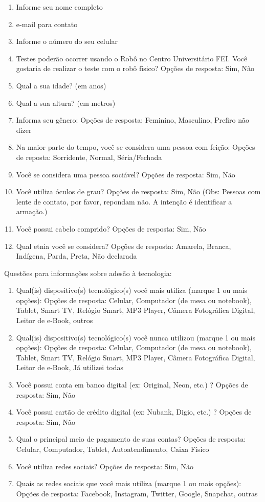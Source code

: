 \begin{enumerate}
	\item Informe seu nome completo
	\item e-mail para contato
	\item Informe o número do seu celular
	\item Testes poderão ocorrer usando o Robô no Centro Universitário FEI. Você gostaria de realizar o teste com o robô físico? Opções de resposta: Sim, Não
	\item Qual a sua idade? (em anos)
	\item Qual a sua altura? (em metros)
	\item Informa seu gênero: Opções de resposta: Feminino, Masculino, Prefiro não dizer
	\item Na maior parte do tempo, você se considera uma pessoa com feição: Opções de reposta: Sorridente, Normal, Séria/Fechada
	\item Você se considera uma pessoa sociável? Opções de resposta: Sim, Não
	\item Você utiliza óculos de grau? Opções de resposta: Sim, Não (Obs: Pessoas com lente de contato, por favor, repondam não. A intenção é identificar a armação.)
	\item Você possui cabelo comprido? Opções de resposta: Sim, Não
	\item Qual etnia você se considera? Opções de resposta: Amarela, Branca, Indígena, Parda, Preta, Não declarada
\end{enumerate}

Questões para informações sobre adesão à tecnologia:

\begin{enumerate}
	\item Qual(is) dispositivo(s) tecnológico(s) você mais utiliza (marque 1 ou mais opções): Opções de resposta: Celular, Computador (de mesa ou notebook), Tablet, Smart TV, Relógio Smart, MP3 Player, Câmera Fotográfica Digital, Leitor de e-Book, outros
	\item Qual(is) dispositivo(s) tecnológico(s) você nunca utilizou (marque 1 ou mais opções): Opções de resposta: Celular, Computador (de mesa ou notebook), Tablet, Smart TV, Relógio Smart, MP3 Player, Câmera Fotográfica Digital, Leitor de e-Book, Já utilizei todas
	\item Você possui conta em banco digital (ex: Original, Neon, etc.) ? Opções de resposta: Sim, Não
	\item Você possui cartão de crédito digital (ex: Nubank, Digio, etc.) ? Opções de resposta: Sim, Não
	\item Qual o principal meio de pagamento de suas contas? Opções de resposta: Celular, Computador, Tablet, Autoatendimento, Caixa Físico
	\item Você utiliza redes sociais? Opções de resposta: Sim, Não
	\item Quais as redes sociais que você mais utiliza (marque 1 ou mais opções): Opções de resposta: Facebook, Instagram, Twitter, Google\+, Snapchat, outras
\end{enumerate}

